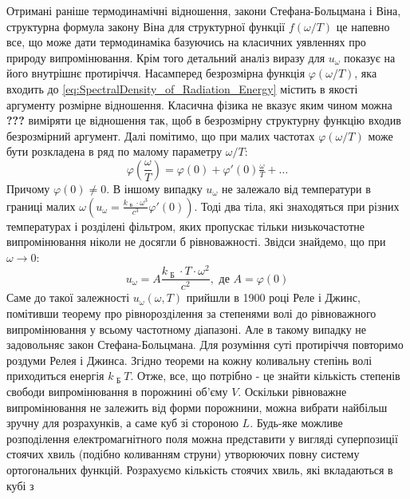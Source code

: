 \documentclass{article}
\begin{document}
\Task{}
Отримані раніше термодинамічні відношення, закони Стефана-Больцмана і Віна, структурна формула закону Віна для структурної функції $f(\omega/T)$ це напевно все, що може дати термодинаміка базуючись на класичних уявленнях про 
природу випромінювання. Крім того детальний аналіз виразу для $u_{\omega}$ показує на його внутрішнє протиріччя. Насамперед безрозмірна функція $\varphi(\omega/T)$, яка входить до \eqref{eq:SpectralDensity_of_Radiation_Energy} 
містить в якості аргументу розмірне відношення. Класична фізика не вказує яким чином можна \textbf{???} виміряти це відношення так, щоб в безрозмірну структурну функцію входив безрозмірний аргумент. Далі помітимо, що при малих 
частотах $\varphi(\omega/T)$ може бути розкладена в ряд по малому параметру $\omega/T$: 
\begin{equation}
    \label{eq:DimensionlessFunctionExpandedIntoSeries}
    \varphi\left(\frac{\omega}{T}\right) = \varphi(0) + \varphi'(0) \tfrac{\omega}{T} + \ldots
\end{equation}
Причому $\varphi(0) \neq 0$. В іншому випадку $u_{\omega}$ не залежало від температури в границі малих $\omega\left(u_{\omega} = \frac{k_{\text{ Б }} \cdot \omega^{3}}{c^{3}} \varphi'(0)\right)$. Тоді два тіла, які знаходяться 
при різних температурах і розділені фільтром, яких пропускає тільки низькочастотне випромінювання ніколи не досягли б рівноважності. Звідси знайдемо, що при $\omega \to 0$: 
\begin{equation}
    \label{Approximation_of_SpectralDensity_at_omega_to_0}
    u_{\omega} = A \frac{k_{\text{ Б }} \cdot T \cdot \omega^{2}}{c^{2}}, \text{ де } A = \varphi(0)
\end{equation}
Саме до такої залежності $u_{\omega}(\omega, T)$ прийшли в 1900 році Реле і Джинс, помітивши теорему про рівнорозділення за степенями волі до рівноважного випромінювання у всьому частотному діапазоні. Але в такому випадку не 
задовольняє закон Стефана-Больцмана. Для розуміння суті протиріччя повторимо роздуми Релея і Джинса. Згідно теореми на кожну коливальну степінь волі приходиться енергія $k_{\text{ Б }}T$. Отже, все, що потрібно - це знайти 
кількість степенів свободи випромінювання в порожнині об’єму $V$. Оскільки рівноважне випромінювання не залежить від форми порожнини, можна вибрати найбільш зручну для розрахунків, а саме куб зі стороною $L$. Будь-яке можливе 
розподілення електромагнітного поля можна представити у вигляді суперпозиції стоячих хвиль (подібно коливанням струни) утворюючих повну систему ортогональних функцій. Розрахуємо кількість стоячих хвиль, які вкладаються в кубі з 
\end{document}
